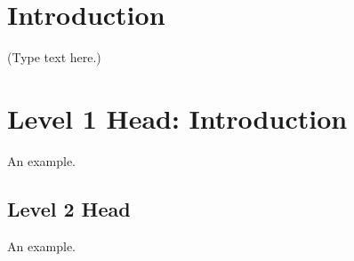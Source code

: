 \documentclass[draft,agums]{aguplus}
\begin{document}
\begin{article}

\section{Introduction}
(Type text here.)


%
%


%
%

\section{Level 1 Head: Introduction}
An example.


%
%

\subsection{Level 2 Head}
An example.


\end{article}
\end{document}
